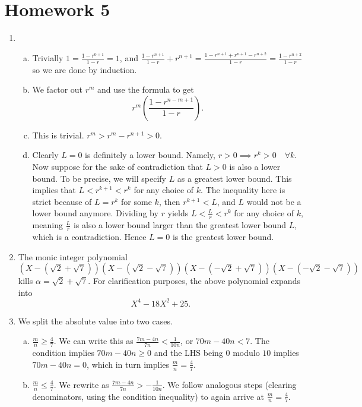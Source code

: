 \documentclass{article}
\begin{document}
\section{Homework 5}

\begin{enumerate}

\item
\begin{enumerate}[(a)]
\item
Trivially $1 = \frac{1 - r^{0 + 1}}{1 - r} = 1$, and $\frac{1 -
r^{n + 1}}{1 - r} + r^{n + 1} = \frac{1 - r^{n + 1} + r^{n + 1} - r^{n +
2}}{1 - r} = \frac{1 - r^{n + 2}}{1 - r}$ so we are done by induction.

\item
We factor out $r^m$ and use the formula to get
\[ r^m \left(\frac{1 - r^{n - m + 1}}{1 - r}\right). \]

\item
This is trivial. $r^m > r^m - r^{n + 1} > 0$.

\item Clearly $L = 0$ is definitely a lower bound. Namely, $r > 0
\implies r^k > 0 \quad \forall k$. Now suppose for the sake of
contradiction that $L > 0$ is also a lower bound. To be precise, we will
specify $L$ as a greatest lower bound. This implies that $L < r^{k + 1}
< r^{k}$ for any choice of $k$. The inequality here is strict because of
$L = r^{k}$ for some $k$, then $r^{k + 1} < L$, and $L$ would not be a
lower bound anymore. Dividing by $r$ yields $L < \frac{L}{r} < r^k$ for
any choice of $k$, meaning $\frac{L}{r}$ is also a lower bound
larger than the greatest lower bound $L$, which is a contradiction.
Hence $L = 0$ is the greatest lower bound.
\end{enumerate}

\item
The monic integer polynomial
\[ \left(X - \left(\sqrt{2} + \sqrt{7}\right)\right)\left(X -
\left(\sqrt{2} - \sqrt{7}\right)\right)\left(X - \left(-\sqrt{2} +
\sqrt{7}\right)\right)\left(X - \left(-\sqrt{2} - \sqrt{7}\right)\right)
\]
kills $\alpha = \sqrt{2} + \sqrt{7}$. For clarification purposes, the
above polynomial expands into
\[ X^4 - 18X^2 + 25. \]

\item
We split the absolute value into two cases.
\begin{enumerate}[(a)]
\item
$\frac{m}{n} \geq \frac{4}{7}$. We can write this as $\frac{7m - 4n}{7n}
< \frac{1}{10n}$, or $70m - 40n < 7$. The condition implies $70m - 40n
\geq 0$ and the LHS being $0$ modulo $10$ implies $70m - 40n = 0$, which
in turn implies $\frac{m}{n} = \frac{4}{7}$.
\item
$\frac{m}{n} \leq \frac{4}{7}$. We rewrite as $\frac{7m - 4n}{7n} >
-\frac{1}{10n}$. We follow analogous steps (clearing denominators, using
the condition inequality) to again arrive at $\frac{m}{n} =
\frac{4}{7}$.
\end{enumerate}


\end{enumerate}
\end{document}
